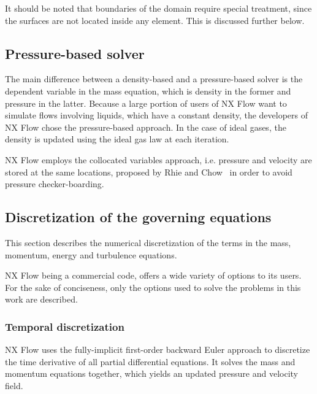 It should be noted that boundaries of the domain require special treatment, since the surfaces are not located inside any element. This is discussed further below.

\subsection{Pressure-based solver}
\label{sec:pbased}
The main difference between a density-based and a pressure-based solver is the dependent variable in the mass equation, which is density in the former and pressure in the latter. Because a large portion of users of NX Flow want to simulate flows involving liquids, which have a constant density, the developers of NX Flow chose the pressure-based approach. In the case of ideal gases, the density is updated using the ideal gas law at each iteration.

NX Flow employs the collocated variables approach, i.e. pressure and velocity are stored at the same locations, proposed by Rhie and Chow~\cite{rhie1983numerical} in order to avoid pressure checker-boarding.

\subsection{Discretization of the governing equations}
\label{sec:nxnum}
This section describes the numerical discretization of the terms in the mass, momentum, energy and turbulence equations.

NX Flow being a commercial code, offers a wide variety of options to its users. For the sake of conciseness, only the options used to solve the problems in this work are described.

\subsubsection{Temporal discretization}
NX Flow uses the fully-implicit first-order backward Euler approach to discretize the time derivative of all partial differential equations. It solves the mass and momentum equations together, which yields an updated pressure and velocity field.


